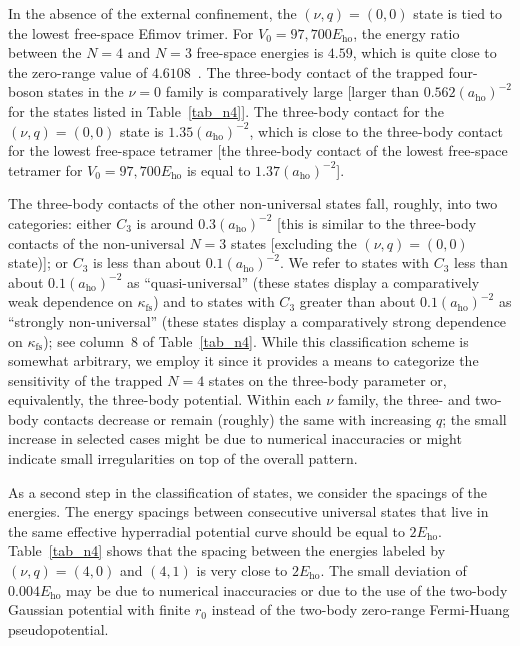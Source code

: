 \documentclass[aps,pra,twocolumn,showpacs,superscriptaddress]{revtex4}
\begin{document}
In the absence of the external confinement, the $(\nu,q)=(0,0)$
state is tied to the lowest free-space Efimov trimer.
For $V_0=97,700 E_{\text{ho}}$, the energy ratio between the 
$N=4$ and $N=3$ free-space energies is $4.59$, which
is quite close to the zero-range value of $4.6108$~\cite{deltuva2010}.
The three-body contact of the trapped four-boson 
states in the $\nu=0$ family
is comparatively large [larger than $0.562 (a_{\text{ho}})^{-2}$ 
for the states listed in Table~\ref{tab_n4}].
The three-body contact
for the $(\nu,q)=(0,0)$ state is
$1.35 (a_{\text{ho}})^{-2}$, which is close to
the three-body contact for the lowest free-space
tetramer [the three-body contact of the lowest free-space
tetramer for $V_0=97,700 E_{\text{ho}}$ is equal to $1.37 (a_{\text{ho}})^{-2}$].


The three-body contacts of the other non-universal 
states fall, roughly, into two categories:
either
$C_3$ is around $0.3 (a_{\text{ho}})^{-2}$ 
[this is similar to the three-body contacts of the 
non-universal $N=3$ states [excluding the $(\nu,q)=(0,0)$
state)]; or $C_3$  is less than about $0.1 (a_{\text{ho}})^{-2}$.
We refer to states with $C_3$ less than about 
$0.1 (a_{\text{ho}})^{-2}$ as ``quasi-universal''
(these states display a comparatively weak dependence on $\kappa_{\text{fs}}$)
and to states with $C_3$ greater than about
$0.1 (a_{\text{ho}})^{-2}$ as ``strongly non-universal''
(these states 
display a comparatively strong dependence on $\kappa_{\text{fs}}$);
see column~8 of Table~\ref{tab_n4}.
While this classification scheme is somewhat arbitrary, 
we employ it since it provides a means 
to categorize the sensitivity of the trapped $N=4$
states on the three-body parameter or, equivalently,
the three-body potential.
Within each $\nu$ family, the three- and two-body
contacts decrease or remain (roughly)
the same with increasing $q$;  
the small increase in selected cases might be due to numerical inaccuracies or
might indicate small irregularities on top of the overall pattern.

As a second step in the classification of states,
we consider the spacings of the energies.
The energy spacings
between consecutive
universal states that live in the same effective
hyperradial potential curve should be equal to $2 E_{\text{ho}}$.
Table~\ref{tab_n4} shows that the spacing between
the energies labeled by
$(\nu,q)=(4,0)$ and $(4,1)$ is very close to $2E_{\text{ho}}$.
The small deviation of $0.004 E_{\text{ho}}$ 
may be due to numerical inaccuracies or due
to the use of the two-body Gaussian potential with finite $r_0$
instead of the two-body zero-range Fermi-Huang pseudopotential.
\end{document}
